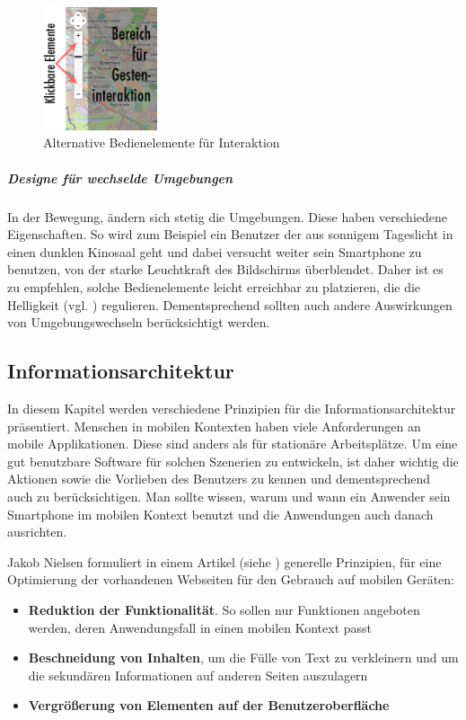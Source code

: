 \begin{figure}[h]
	\centering
	\includegraphics[width=0.3\textwidth]{img/NUIbsp.png}
	\caption{Alternative Bedienelemente für Interaktion}\label{fig:nuibsp}
\end{figure}

\subparagraph{Designe für wechselde Umgebungen} %
\label{subp:designe_f_r_au_eneinsatz}

In der Bewegung, ändern sich stetig die Umgebungen. Diese haben verschiedene Eigenschaften. So wird zum Beispiel ein Benutzer der aus sonnigem Tageslicht in einen dunklen Kinosaal geht und dabei versucht weiter sein Smartphone zu benutzen, von der starke Leuchtkraft des Bildschirms überblendet. Daher ist es zu empfehlen, solche Bedienelemente leicht erreichbar zu platzieren, die die Helligkeit (vgl. \cite[ff Seite 418]{mobileInteraces}) regulieren. Dementsprechend sollten auch andere Auswirkungen von Umgebungswechseln berücksichtigt werden.

\subsection{Informationsarchitektur}
\label{sec:Informationsaufbereitung}

In diesem Kapitel werden verschiedene Prinzipien für die Informationsarchitektur präsentiert.
Menschen in mobilen Kontexten haben viele Anforderungen an mobile Applikationen. Diese sind anders als für stationäre Arbeitsplätze. Um eine gut benutzbare Software für solchen Szenerien zu entwickeln, ist daher wichtig die Aktionen sowie die Vorlieben des Benutzers zu kennen und dementsprechend auch zu berücksichtigen. Man sollte wissen, warum und wann ein Anwender sein Smartphone im mobilen Kontext benutzt und die Anwendungen auch danach ausrichten.

Jakob Nielsen formuliert in einem Artikel (siehe \cite{nielsen}) generelle Prinzipien, für eine Optimierung der vorhandenen Webseiten für den Gebrauch auf mobilen Geräten:
\begin{itemize}
	\item \textbf{Reduktion der Funktionalität}. So sollen nur Funktionen angeboten werden, deren Anwendungsfall in einen mobilen Kontext passt
	\item \textbf{Beschneidung von Inhalten}, um die Fülle von Text zu verkleinern und um die sekundären Informationen auf anderen Seiten auszulagern
	\item \textbf{Vergrößerung von Elementen auf der Benutzeroberfläche}
\end{itemize}

